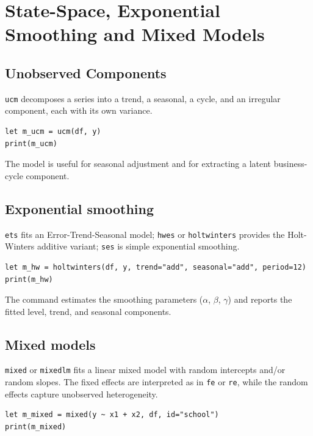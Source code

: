 \chapter{State-Space, Exponential Smoothing and Mixed Models}

\section{Unobserved Components}

\texttt{ucm} decomposes a series into a trend, a seasonal, a cycle, and an
irregular component, each with its own variance.

\begin{lstlisting}[caption={UCM}]
let m_ucm = ucm(df, y)
print(m_ucm)
\end{lstlisting}

The model is useful for seasonal adjustment and for extracting a latent
business-cycle component.

\section{Exponential smoothing}

\texttt{ets} fits an Error-Trend-Seasonal model; \texttt{hwes} or \texttt{holtwinters}
provides the Holt-Winters additive variant; \texttt{ses} is simple exponential
smoothing.

\begin{lstlisting}[caption={Holt-Winters}]
let m_hw = holtwinters(df, y, trend="add", seasonal="add", period=12)
print(m_hw)
\end{lstlisting}

The command estimates the smoothing parameters ($\alpha$, $\beta$,
$\gamma$) and reports the fitted level, trend, and seasonal components.

\section{Mixed models}

\texttt{mixed} or \texttt{mixedlm} fits a linear mixed model with random intercepts
and/or random slopes. The fixed effects are interpreted as in \texttt{fe} or
\texttt{re}, while the random effects capture unobserved heterogeneity.

\begin{lstlisting}[caption={Linear mixed model}]
let m_mixed = mixed(y ~ x1 + x2, df, id="school")
print(m_mixed)
\end{lstlisting}

